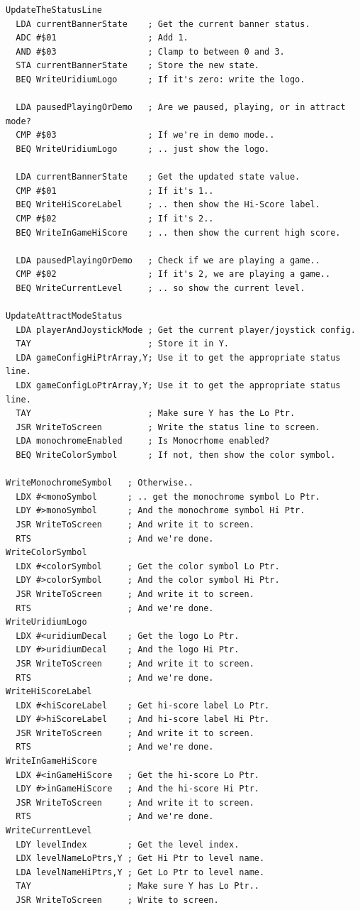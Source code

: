 \clearpage
\begin{lstlisting}[basicstyle=\scriptsize\ttfamily, escapechar=\%]
UpdateTheStatusLine
  LDA currentBannerState    ; Get the current banner status.
  ADC #$01                  ; Add 1.
  AND #$03                  ; Clamp to between 0 and 3.
  STA currentBannerState    ; Store the new state.
  BEQ WriteUridiumLogo      ; If it's zero: write the logo.
                           
  LDA pausedPlayingOrDemo   ; Are we paused, playing, or in attract mode?
  CMP #$03                  ; If we're in demo mode..
  BEQ WriteUridiumLogo      ; .. just show the logo.
                           
  LDA currentBannerState    ; Get the updated state value.
  CMP #$01                  ; If it's 1..
  BEQ WriteHiScoreLabel     ; .. then show the Hi-Score label.
  CMP #$02                  ; If it's 2..
  BEQ WriteInGameHiScore    ; .. then show the current high score.
                           
  LDA pausedPlayingOrDemo   ; Check if we are playing a game..
  CMP #$02                  ; If it's 2, we are playing a game..
  BEQ WriteCurrentLevel     ; .. so show the current level.

UpdateAttractModeStatus
  LDA playerAndJoystickMode ; Get the current player/joystick config.
  TAY                       ; Store it in Y.
  LDA gameConfigHiPtrArray,Y; Use it to get the appropriate status line.
  LDX gameConfigLoPtrArray,Y; Use it to get the appropriate status line.
  TAY                       ; Make sure Y has the Lo Ptr.
  JSR WriteToScreen         ; Write the status line to screen.
  LDA monochromeEnabled     ; Is Monocrhome enabled?
  BEQ WriteColorSymbol      ; If not, then show the color symbol.

WriteMonochromeSymbol   ; Otherwise..
  LDX #<monoSymbol      ; .. get the monochrome symbol Lo Ptr.
  LDY #>monoSymbol      ; And the monochrome symbol Hi Ptr.
  JSR WriteToScreen     ; And write it to screen.
  RTS                   ; And we're done.
WriteColorSymbol   
  LDX #<colorSymbol     ; Get the color symbol Lo Ptr.
  LDY #>colorSymbol     ; And the color symbol Hi Ptr.
  JSR WriteToScreen     ; And write it to screen.
  RTS                   ; And we're done.
WriteUridiumLogo 
  LDX #<uridiumDecal    ; Get the logo Lo Ptr.
  LDY #>uridiumDecal    ; And the logo Hi Ptr.
  JSR WriteToScreen     ; And write it to screen.
  RTS                   ; And we're done.
WriteHiScoreLabel   
  LDX #<hiScoreLabel    ; Get hi-score label Lo Ptr.
  LDY #>hiScoreLabel    ; And hi-score label Hi Ptr.
  JSR WriteToScreen     ; And write it to screen.
  RTS                   ; And we're done.
WriteInGameHiScore   
  LDX #<inGameHiScore   ; Get the hi-score Lo Ptr.
  LDY #>inGameHiScore   ; And the hi-score Hi Ptr.
  JSR WriteToScreen     ; And write it to screen.
  RTS                   ; And we're done.
WriteCurrentLevel   
  LDY levelIndex        ; Get the level index.
  LDX levelNameLoPtrs,Y ; Get Hi Ptr to level name.
  LDA levelNameHiPtrs,Y ; Get Lo Ptr to level name.
  TAY                   ; Make sure Y has Lo Ptr..
  JSR WriteToScreen     ; Write to screen.
\end{lstlisting}
